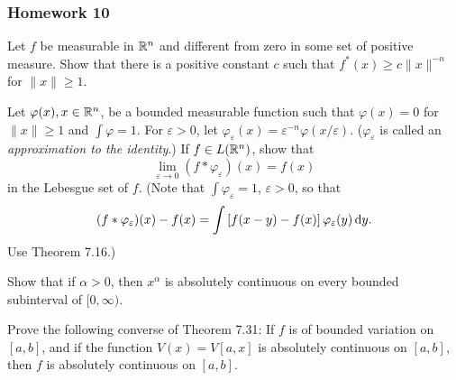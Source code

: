 \subsubsection{Homework 10}
\setcounter{exercise}{0}
\setcounter{equation}{0}

\begin{problem}
  Let \(f\) be measurable in \(\mathbb{R}^n\) and different from zero in some set
  of positive measure. Show that there is a positive constant \(c\) such
  that \(f^*( x )\geq c\| x \|^{-n}\) for \(\| x \|\geq 1\).
\end{problem}
\begin{solution}
\end{solution}

\begin{problem}
  Let \(\varphi( x ), x \in\mathbb{R}^n\), be a bounded measurable function such
  that \(\varphi( x )=0\) for \(\| x \|\geq 1\) and \(\int\varphi=1\). For
  \(\varepsilon>0\), let
  \(\varphi_\varepsilon( x )=\varepsilon^{-n}\varphi( x /\varepsilon)\).
  (\(\varphi_\varepsilon\) is called an \emph{approximation to the
    identity}.) If \(f\in L(\mathbb{R}^n)\), show that
  \[
    \lim_{\varepsilon\to 0}(f*\varphi_\varepsilon)( x )=f( x )
  \]
  in the Lebesgue set of \(f\). (Note that \(\int\varphi_\varepsilon=1\),
  \(\varepsilon>0\), so that
  \[
    (f*\varphi_\varepsilon)( x )-f( x )=\int\left[f( x - y )-f( x )\right]\varphi_\varepsilon( y )\mathop{}\!\mathrm{d} y .
  \]
  Use Theorem 7.16.)
\end{problem}
\begin{solution}
\end{solution}

\begin{problem}
  Show that if \(\alpha>0\), then \(x^\alpha\) is absolutely continuous on
  every bounded subinterval of \([0,\infty)\).
\end{problem}
\begin{solution}
\end{solution}

\begin{problem}
  Prove the following converse of Theorem 7.31: If \(f\) is of bounded
  variation on \([a,b]\), and if the function \(V(x)=V[a,x]\) is absolutely
  continuous on \([a,b]\), then \(f\) is absolutely continuous on
  \([a,b]\).
\end{problem}
\begin{solution}
\end{solution}

